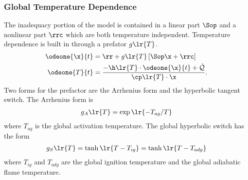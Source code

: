 \subsubsection{Global Temperature Dependence}
The inadequacy portion of the model is contained in a linear part $\Sop$ and a nonlinear part 
$\rrc$ which are both temperature independent.  Temperature dependence is built in through 
a prefator $g\lr{T}$.  
\begin{align}
  \odeone{\x}{t} &= \rr + g\lr{T}\left[\Sop \x + \rrc\right] \\
  \odeone{T}{t}  &= \frac{-\displaystyle \h\lr{T}\cdot\odeone{\x}{t} + \dot{\mathcal{Q}}}{\displaystyle \cp\lr{T}\cdot\x}.
\end{align}
Two forms for the prefactor are the Arrhenius form and the hyperbolic tangent switch. 
The Arrhenius form is
\begin{align}
  g_{A}\lr{T} = \exp\lr{-T_{ag} / T}
\end{align}
where $T_{ag}$ is the global activation temperature.  The global hyperbolic switch has 
the form
\begin{align}
  g_{S}\lr{T} = \tanh\lr{T-T_{ig}} = \tanh\lr{T - T_{adg}}
\end{align}
where $T_{ig}$ and $T_{adg}$ are the global ignition temperature and the global 
adiabatic flame temperature.
